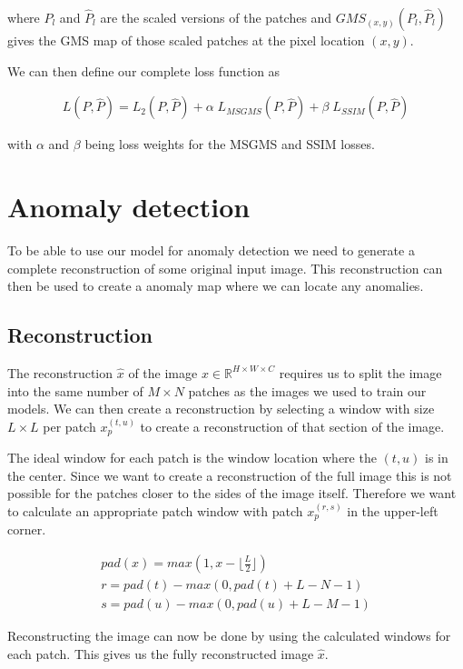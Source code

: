 where $P_l$ and $\hat{P}_l$ are the scaled versions of the patches and $GMS_{(x,y)}(P_l, \hat{P}_l)$ gives the GMS map of those scaled patches at the pixel location $(x,y)$.

We can then define our complete loss function as 

\begin{align}
L(P, \hat{P}) = L_2(P, \hat{P}) + \alpha \; L_{MSGMS}(P, \hat{P}) + \beta \; L_{SSIM}(P, \hat{P})
\end{align}

with $\alpha$ and $\beta$ being loss weights for the MSGMS and SSIM losses.

\section{Anomaly detection}\label{sec:methods:anomaly-detection}

To be able to use our model for anomaly detection we need to generate a complete reconstruction of some original input image. This reconstruction can then be used to create a anomaly map where we can locate any anomalies.

\subsection{Reconstruction}

The reconstruction $\hat{x}$ of the image $x \in \mathbb{R}^{H \times W \times C}$ requires us to split the image into the same number of $M \times N$ patches as the images we used to train our models.
We can then create a reconstruction by selecting a window with size $L \times L$ per patch $x_p^{(t,u)}$ to create a reconstruction of that section of the image.

The ideal window for each patch is the window location where the $(t,u)$ is in the center. Since we want to create a reconstruction of the full image this is not possible for the patches closer to the sides of the image itself. Therefore we want to calculate an appropriate patch window with patch $x_p^{(r,s)}$ in the upper-left corner.

%
\begin{align}
pad(x) = max(1, x - \lfloor \frac{L}{2} \rfloor)\\
r = pad(t) - max(0, pad(t) + L - N - 1)\\
s = pad(u) - max(0, pad(u) + L - M - 1)
\end{align}
%

Reconstructing the image can now be done by using the calculated windows for each patch. This gives us the fully reconstructed image $\hat{x}$.

